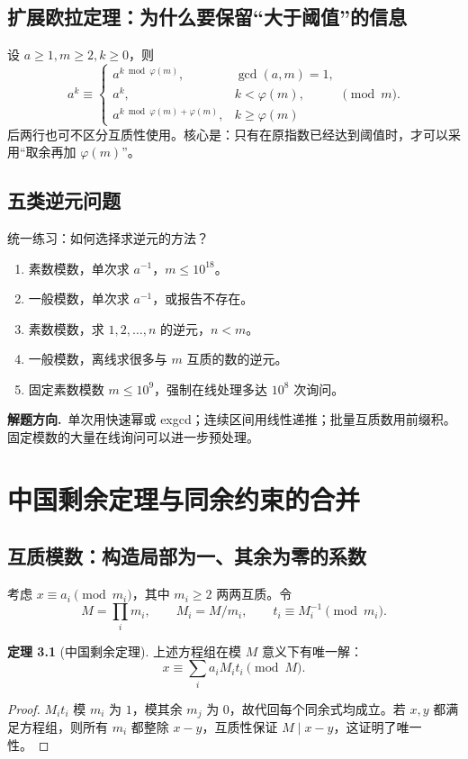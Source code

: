 \documentclass[UTF8,a4paper,11pt,oneside,openany,fontset=fandol]{ctexbook}
\theoremstyle{definition}
\newtheorem{theorem}[definition]{定理}
\newcommand{\hint}{\par\noindent\textbf{解题方向.}\ }
\begin{document}
\section{扩展欧拉定理：为什么要保留“大于阈值”的信息}
设 $a\ge1,m\ge2,k\ge0$，则
\[
 a^k\equiv
 \begin{cases}
 a^{k\bmod\varphi(m)},&\gcd(a,m)=1,\\
 a^k,&k<\varphi(m),\\
 a^{k\bmod\varphi(m)+\varphi(m)},&k\ge\varphi(m)
 \end{cases}\pmod m.
\]
后两行也可不区分互质性使用。核心是：只有在原指数已经达到阈值时，才可以采用“取余再加 $\varphi(m)$”。



\section{五类逆元问题}
\begin{problem}{统一练习：如何选择求逆元的方法？}
\begin{enumerate}[label=(\alph*)]
\item 素数模数，单次求 $a^{-1}$，$m\le10^{18}$。
\item 一般模数，单次求 $a^{-1}$，或报告不存在。
\item 素数模数，求 $1,2,\ldots,n$ 的逆元，$n<m$。
\item 一般模数，离线求很多与 $m$ 互质的数的逆元。
\item 固定素数模数 $m\le10^9$，强制在线处理多达 $10^8$ 次询问。
\end{enumerate}
\end{problem}
\hint 单次用快速幂或 exgcd；连续区间用线性递推；批量互质数用前缀积。固定模数的大量在线询问可以进一步预处理。




\chapter{中国剩余定理与同余约束的合并}
\section{互质模数：构造局部为一、其余为零的系数}
考虑 $x\equiv a_i\pmod{m_i}$，其中 $m_i\ge2$ 两两互质。令
\[
 M=\prod_i m_i,\qquad M_i=M/m_i,\qquad t_i\equiv M_i^{-1}\pmod{m_i}.
\]
\begin{theorem}[中国剩余定理]
上述方程组在模 $M$ 意义下有唯一解：
\[
 x\equiv\sum_i a_iM_it_i\pmod M.
\]
\end{theorem}
\begin{proof}
$M_it_i$ 模 $m_i$ 为 $1$，模其余 $m_j$ 为 $0$，故代回每个同余式均成立。若 $x,y$ 都满足方程组，则所有 $m_i$ 都整除 $x-y$，互质性保证 $M\mid x-y$，这证明了唯一性。
\end{proof}
\end{document}
